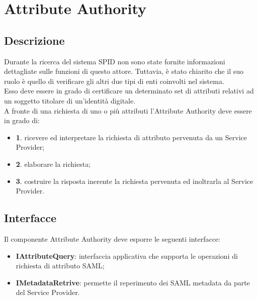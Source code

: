 \section{Attribute Authority}
\subsection{Descrizione}
Durante la ricerca del sistema SPID non sono state fornite informazioni dettagliate sulle funzioni di questo attore. Tuttavia, è stato chiarito che il suo ruolo è quello di 
verificare gli altri due tipi di enti coinvolti nel sistema.
\\ Esso deve essere in grado di certificare un determinato set di attributi relativi ad un soggetto titolare di
un'identità digitale. 
\\ A fronte di una richiesta di uno o più attributi l’Attribute Authority deve essere
in grado di:
\begin{itemize}
    \item \textbf{1}. ricevere ed interpretare la richiesta di attributo pervenuta da un Service Provider;
    \item \textbf{2}. elaborare la richiesta;
    \item \textbf{3}. costruire la risposta inerente la richiesta pervenuta ed inoltrarla al Service Provider.
\end{itemize}

\subsection{Interfacce}
Il componente Attribute Authority deve esporre le seguenti interfacce:
\begin{itemize}
    \item \textbf{IAttributeQuery}: interfaccia applicativa che supporta le operazioni di richiesta di attributo SAML;
    \item \textbf{IMetadataRetrive}: permette il reperimento dei SAML metadata da parte del Service Provider.
\end{itemize}